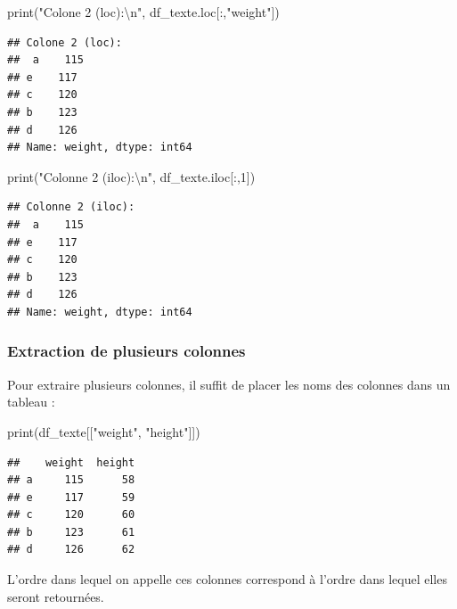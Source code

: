 \documentclass[
  12pt,
]{book}
\newenvironment{Shaded}{\begin{snugshade}}{\end{snugshade}}
\newcommand{\BuiltInTok}[1]{#1}
\newcommand{\CharTok}[1]{\textcolor[rgb]{0.31,0.60,0.02}{#1}}
\newcommand{\DecValTok}[1]{\textcolor[rgb]{0.00,0.00,0.81}{#1}}
\newcommand{\NormalTok}[1]{#1}
\newcommand{\StringTok}[1]{\textcolor[rgb]{0.31,0.60,0.02}{#1}}
\numberwithin{equation}{section}
\numberwithin{countremarque}{section}
\begin{document}
\begin{Shaded}
\begin{Highlighting}[]
\BuiltInTok{print}\NormalTok{(}\StringTok{"Colone 2 (loc):}\CharTok{\textbackslash{}n}\StringTok{"}\NormalTok{, df\_texte.loc[:,}\StringTok{"weight"}\NormalTok{])}
\end{Highlighting}
\end{Shaded}

\begin{lstlisting}
## Colone 2 (loc):
##  a    115
## e    117
## c    120
## b    123
## d    126
## Name: weight, dtype: int64
\end{lstlisting}

\begin{Shaded}
\begin{Highlighting}[]
\BuiltInTok{print}\NormalTok{(}\StringTok{"Colonne 2 (iloc):}\CharTok{\textbackslash{}n}\StringTok{"}\NormalTok{, df\_texte.iloc[:,}\DecValTok{1}\NormalTok{])}
\end{Highlighting}
\end{Shaded}

\begin{lstlisting}
## Colonne 2 (iloc):
##  a    115
## e    117
## c    120
## b    123
## d    126
## Name: weight, dtype: int64
\end{lstlisting}

\subsubsection{Extraction de plusieurs colonnes}\label{extraction-de-plusieurs-colonnes}

Pour extraire plusieurs colonnes, il suffit de placer les noms des colonnes dans un tableau :

\begin{Shaded}
\begin{Highlighting}[]
\BuiltInTok{print}\NormalTok{(df\_texte[[}\StringTok{"weight"}\NormalTok{, }\StringTok{"height"}\NormalTok{]])}
\end{Highlighting}
\end{Shaded}

\begin{lstlisting}
##    weight  height
## a     115      58
## e     117      59
## c     120      60
## b     123      61
## d     126      62
\end{lstlisting}

L'ordre dans lequel on appelle ces colonnes correspond à l'ordre dans lequel elles seront retournées.
\end{document}
